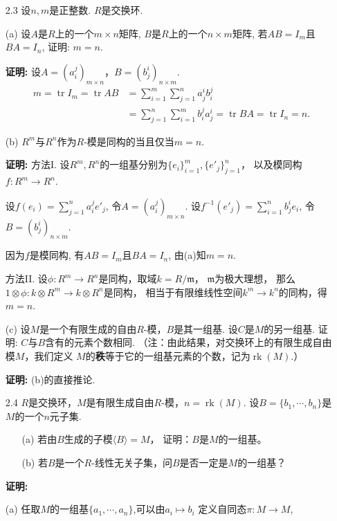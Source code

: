 \begin{enumerate}
    \item[2.3]
    设$n,m$是正整数. $R$是交换环.
    \item[(a)] 设$A$是$R$上的一个$m\times n$矩阵, 
        $B$是$R$上的一个$n\times m$矩阵, 
        若$AB=I_m$且$BA=I_n$, 证明: $m=n$.

    \item[\textbf{证明:}]
    设$A=(a_i^j)_{m\times n}$，$B=(b_j^i)_{n\times m}$.
    \begin{align*}
        m=\operatorname{tr} I_m=\operatorname{tr} AB
        &=\sum_{i=1}^m \sum_{j=1}^n a_j^ib_i^j\\
        &=\sum_{j=1}^n \sum_{i=1}^m b_i^ja_j^i
        =\operatorname{tr} BA=\operatorname{tr} I_n=n.
    \end{align*}

    \item[(b)] $R^m$与$R^n$作为$R$-模是同构的当且仅当$m=n$.

    \item[\textbf{证明:}]
        方法I. 设$R^m, R^n$的一组基分别为$\{e_i\}_{i=1}^m, \{e'_j\}_{j=1}^n$，
        以及模同构$f: R^m\rightarrow R^n$.\par
        设$f(e_i)=\sum\limits_{j=1}^n a_i^j e'_j$, 令$A=(a_i^j)_{m\times n}$. 
        设$f^{-1}(e'_j)=\sum\limits_{i=1}^n b_j^i e_i$, 
        令$B=(b_j^i)_{n\times m}$.\par
        因为$f$是模同构, 有$AB=I_m$且$BA=I_n$, 由(a)知$m=n$.

        方法II. 设$\phi\colon R^m\to R^n$是同构，取域$k=R/\mathfrak{m}$，
        $\mathfrak{m}$为极大理想，
        那么$1\otimes\phi\colon k\otimes R^m\to k\otimes R^n$是同构，
        相当于有限维线性空间$k^m\to k^n$的同构，得$m=n$.

    \item[(c)] 设$M$是一个有限生成的自由$R$-模，$B$是其一组基. 
        设$C$是$M$的另一组基. 证明: $C$与$B$含有的元素个数相同.
        （注：由此结果，对交换环上的有限生成自由模$M$，我们定义
        $M$的\textbf{秩}等于它的一组基元素的个数，记为$\operatorname{rk}(M)$.）

    \item[\textbf{证明:}]
        (b)的直接推论.
    
    \item[2.4] $R$是交换环，$M$是有限生成自由$R$-模，$n=\operatorname{rk}(M)$.
    设$B=\{b_1,\cdots,b_n\}$是$M$的一个$n$元子集.
    \begin{itemize}
        \item[(a)] 若由$B$生成的子模$\langle B\rangle=M$，
        证明：$B$是$M$的一组基。
        \item[(b)] 若$B$是一个$R$-线性无关子集，问$B$是否一定是$M$的一组基？
    \end{itemize}
    \item[\textbf{证明:}]
    \item[(a)] 任取$M$的一组基$\{a_1,\cdots, a_n\}$,可以由$a_i \mapsto b_i$
    定义自同态$\pi:M\to M$,


\end{enumerate}
